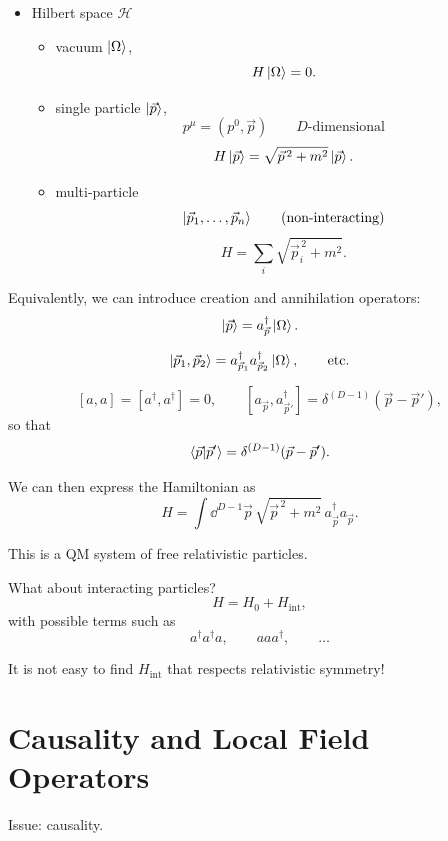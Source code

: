 \begin{itemize}
  \item Hilbert space $\mathcal H$
  \begin{itemize}
    \item vacuum $\ket{\Omega}$,
    \[
      H\ket{\Omega}=0.
    \]
    \item single particle $\ket{\vec p}$,
    \[
      p^\mu=(p^0,\vec p)
      \qquad
      \text{$D$-dimensional}
    \]
    \[
      H\ket{\vec p}=\sqrt{\vec p^{\,2}+m^2}\ket{\vec p}.
    \]
    \item multi-particle
    \[
      \ket{\vec p_1,\ldots,\vec p_n}
      \qquad
      \text{(non-interacting)}
    \]
    \[
      H=\sum_i \sqrt{\vec p_i^{\,2}+m^2}.
    \]
  \end{itemize}
\end{itemize}

Equivalently, we can introduce creation and annihilation operators:
\[
  \ket{\vec p}=a^\dagger_{\vec p}\ket{\Omega}.
\]

\[
  \ket{\vec p_1,\vec p_2}
  =
  a^\dagger_{\vec p_1}a^\dagger_{\vec p_2}\ket{\Omega},
  \qquad \text{etc.}
\]

\[
  [a,a]=[a^\dagger,a^\dagger]=0,
  \qquad
  [a_{\vec p},a^\dagger_{\vec p'}]
  =
  \delta^{(D-1)}(\vec p-\vec p'),
\]
so that
\[
  \braket{\vec p}{\vec p'}
  =
  \delta^{(D-1)}(\vec p-\vec p').
\]

We can then express the Hamiltonian as
\[
  H
  =
  \int \dd^{D-1}\vec p\,
  \sqrt{\vec p^{\,2}+m^2}\,
  a^\dagger_{\vec p}a_{\vec p}.
\]

This is a QM system of free relativistic particles.

What about interacting particles?
\[
  H=H_0+H_{\mathrm{int}},
\]
with possible terms such as
\[
  a^\dagger a^\dagger a,\qquad
  a a a^\dagger,\qquad \ldots
\]

It is not easy to find $H_{\mathrm{int}}$ that respects relativistic symmetry!

\section{Causality and Local Field Operators}

Issue: causality.

